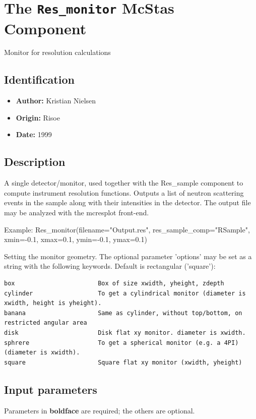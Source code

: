 \section{The \texttt{Res\_monitor} McStas Component}
Monitor for resolution calculations

\subsection*{Identification}
\begin{itemize}
  \item \textbf{Author:} Kristian Nielsen
  \item \textbf{Origin:} Risoe
  \item \textbf{Date:} 1999
\end{itemize}

\subsection*{Description}
A single detector/monitor, used together with the Res\_sample component to compute instrument resolution functions. Outputs a list of neutron scattering events in the sample along with their intensities in the detector. The output file may be analyzed with the mcresplot front-end.

Example: Res\_monitor(filename="Output.res", res\_sample\_comp="RSample", xmin=-0.1, xmax=0.1, ymin=-0.1, ymax=0.1)

Setting the monitor geometry. The optional parameter 'options' may be set as a string with the following keywords. Default is rectangular ('square'):

\begin{verbatim}
box                       Box of size xwidth, yheight, zdepth
cylinder                  To get a cylindrical monitor (diameter is xwidth, height is yheight).
banana                    Same as cylinder, without top/bottom, on restricted angular area
disk                      Disk flat xy monitor. diameter is xwidth.
sphrere                   To get a spherical monitor (e.g. a 4PI) (diameter is xwidth).
square                    Square flat xy monitor (xwidth, yheight)
\end{verbatim}

\subsection*{Input parameters}
Parameters in \textbf{boldface} are required; the others are optional.

